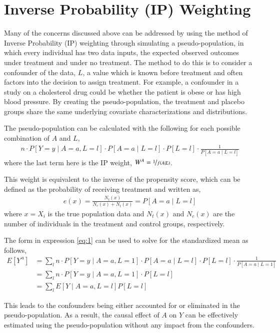 \section{Inverse Probability (IP) Weighting} \label{IP Weighting} 
Many of the concerns discussed above can be addressed by using the method of Inverse Probability (IP) weighting through simulating a pseudo-population, in which every individual has two data inputs, the expected observed outcomes under treatment and under no treatment.  The method to do this is to consider a confounder of the data, $L$, a value which is known before treatment and often factors into the decision to assign treatment.  For example, a confounder in a study on a cholesterol drug could be whether the patient is obese or has high blood pressure.  By creating the pseudo-population, the treatment and placebo groups share the same underlying covariate characterizations and distributions. 

The pseudo-population can be calculated with the following for each possible combination of $A$ and $L$, 
\begin{align} \label{eq:1}
n\cdot P[Y=y \mid A = a, L= l] \cdot P[A=a \mid L=l]  \cdot P[L=l] \cdot \frac{1}{P[A = a \mid L = l]} \end{align}  
where the last term here is the IP weight, $W^{A} = \nicefrac{1}{f(A\mid L)}$.  

This weight is equivalent to the inverse of the propensity score, which can be defined as the probability of receiving treatment and written as,\cite{imbens2015causal}
\begin{align} 
e(x) = \frac{N_t(x)}{N_c(x) + N_t(x)} = P[A=a \mid L = l] 
\end{align} 
where $x = X_i$ is the true population data and $N_t(x)$ and $N_c (x)$ are the number of individuals in the treatment and control groups, respectively.  

The form in expression \ref{eq:1} can be used to solve for the standardized mean as follows, 
\begin{align} 
E[Y^{\,a}] &= \sum_l n \cdot P[Y=y \mid A = a, L= 1] \cdot P[A=a \mid L=l]  \cdot P[L=l] \cdot \frac{1}{P[A = a \mid L = 1]} \\ 
&=  \sum_l n \cdot P[Y=y \mid A = a, L= 1] \cdot P[L=l]\\ 
&= \sum_l E[Y \mid A=a, L= l] P[L=l] 
\end{align} 

This leads to the confounders being either accounted for or eliminated in the pseudo-population.  As a result, the causal effect of $A$ on $Y$ can be effectively estimated using the pseudo-population without any impact from the confounders.  

